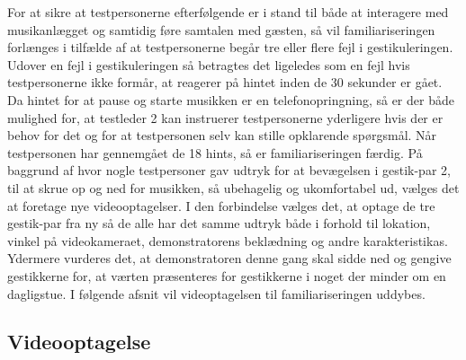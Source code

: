 For at sikre at testpersonerne efterfølgende er i stand til både at interagere med musikanlægget og samtidig føre samtalen med gæsten, så vil familiariseringen forlænges i tilfælde af at testpersonerne begår tre eller flere fejl i gestikuleringen. Udover en fejl i gestikuleringen så betragtes det ligeledes som en fejl hvis testpersonerne ikke formår, at reagerer på hintet inden de 30 sekunder er gået. Da hintet for at pause og starte musikken er en telefonopringning, så er der både mulighed for, at testleder 2 kan instruerer testpersonerne yderligere hvis der er behov for det og for at testpersonen selv kan stille opklarende spørgsmål. Når testpersonen har gennemgået de 18 hints, så er familiariseringen færdig.\blankline
%
På baggrund af  hvor nogle testpersoner gav udtryk for at bevægelsen i gestik-par 2, til at skrue op og ned for musikken, så ubehagelig og ukomfortabel ud, vælges det at foretage nye videooptagelser. I den forbindelse vælges det, at optage de tre gestik-par fra ny så de alle har det samme udtryk både i forhold til lokation, vinkel på videokameraet, demonstratorens beklædning og andre karakteristikas. Ydermere vurderes det, at demonstratoren denne gang skal sidde ned og gengive gestikkerne for, at værten præsenteres for gestikkerne i noget der minder om en dagligstue. I følgende afsnit vil videoptagelsen til familiariseringen uddybes. 
% 
\subsection{Videooptagelse}
\label{VideooptagelseSocialAccept}